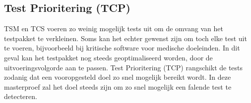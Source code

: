 \noindent{}

\subsection{Test Prioritering (TCP)}
\noindent TSM en TCS voeren zo weinig mogelijk tests uit om de omvang van het testpakket te verkleinen. Soms kan het echter gewenst zijn om toch elke test uit te voeren, bijvoorbeeld bij kritische software voor medische doeleinden. In dit geval kan het testpakket nog steeds geoptimaliseerd worden, door de uitvoeringsvolgorde aan te passen. Test Prioritering (TCP) \cite{10.1002/stv.430} rangschikt de tests zodanig dat een vooropgesteld doel zo snel mogelijk bereikt wordt. In deze masterproef zal het doel steeds zijn om zo snel mogelijk een falende test te detecteren.\\

\noindent{}